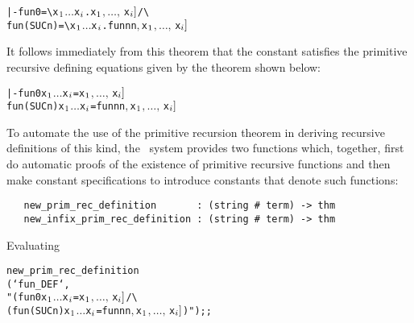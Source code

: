 \begin{hol}\begin{alltt}
   |- fun 0       = \verb!\!x\(\sb{1}\) \(\dots\) x\(\sb{i}\).\m{f\sb{1}[}x\(\sb{1}\)\(,\ldots,\,\)x\(\sb{i}]\) /\verb!\!
      fun (SUC n) = \verb!\!x\(\sb{1}\) \(\dots\) x\(\sb{i}\).\m{f\sb{2}[}fun n  n\(,\) x\(\sb{1}\)\(,\ldots,\,\)x\(\sb{i}]\)
\end{alltt}\end{hol}

\noindent It follows immediately from this theorem that the constant 
satisfies the primitive recursive defining equations given by the theorem shown
below:

\begin{hol}\begin{alltt}
   |- fun 0 x\(\sb{1}\) \(\dots\) x\(\sb{i}\) = \m{f\sb{1}[}x\(\sb{1}\)\(,\ldots,\,\)x\(\sb{i}]\)
      fun (SUC n) x\(\sb{1}\) \(\dots\) x\(\sb{i}\) = \m{f\sb{2}[}fun n  n\(,\) x\(\sb{1}\)\(,\ldots,\,\)x\(\sb{i}]\)
\end{alltt}\end{hol}

To automate the use of the primitive recursion theorem in deriving recursive
definitions of this kind, the \HOL\ system provides two functions which,
together, first do automatic proofs of the existence of primitive recursive
functions and then make constant specifications to introduce constants that
denote such functions:

\begin{boxed}
\begin{verbatim}
   new_prim_rec_definition       : (string # term) -> thm
   new_infix_prim_rec_definition : (string # term) -> thm
\end{verbatim}\end{boxed}

\noindent Evaluating

\begin{hol}\begin{alltt}
   new_prim_rec_definition
    (`fun_DEF`,
     "(fun 0 x\(\sb{1}\) \(\dots\) x\(\sb{i}\) = \m{f\sb{1}[}x\(\sb{1}\)\(,\ldots,\,\)x\(\sb{i}]\) /\verb!\!
      (fun (SUC n) x\(\sb{1}\) \(\dots\) x\(\sb{i}\) = \m{f\sb{2}[}fun n  n\(,\) x\(\sb{1}\)\(,\ldots,\,\)x\(\sb{i}]\))");;
\end{alltt}\end{hol}

